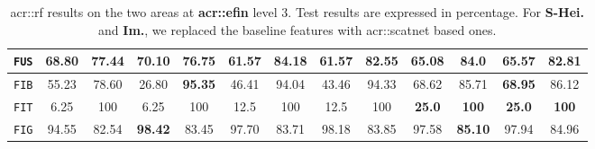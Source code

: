 \begin{table}[htpb]
\begin{center}
\begin{tabular}{| c | c c | c c | c c | c c | c c | c c |}
                        \hline
                        \texttt{FUS} & 68.80 & 77.44 & \textbf{70.10} & 76.75 & 61.57 & \textbf{84.18} & 61.57 & 82.55 & 65.08 & 84.0 & 65.57 & 82.81 \\
                        \hline
                        \texttt{FIB} & 55.23 & 78.60 & 26.80 & \textbf{95.35} & 46.41 & 94.04 & 43.46 & 94.33 & 68.62 & 85.71 & \textbf{68.95} & 86.12 \\
                        \hline
                        \texttt{FIT} & 6.25 & 100 & 6.25 & 100 & 12.5 & 100 & 12.5 & 100 & \textbf{25.0} & \textbf{100} & \textbf{25.0} & \textbf{100} \\
                        \hline
                        \texttt{FIG} & 94.55 & 82.54 & \textbf{98.42} & 83.45 & 97.70 & 83.71 & 98.18 & 83.85 & 97.58 & \textbf{85.10} & 97.94 & 84.96 \\
                        \hline
                    \end{tabular}
                \end{center}
                \caption{
                    \label{tab::stats_scat_kpca_rf_f3}
                    \gls{acr::rf} results on the two areas at \textbf{\gls{acr::efin}} level 3.
                    Test results are expressed in percentage.
                    For \textbf{S-Hei.} and \textbf{Im.}, we replaced the baseline features with \gls{acr::scatnet} based ones.
                }
            \end{table}
